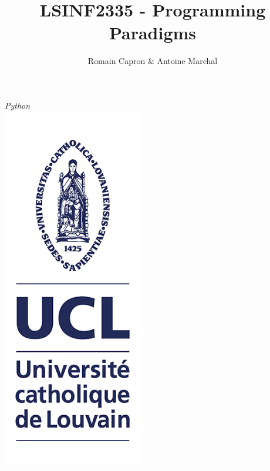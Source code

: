 

\title{LSINF2335 - Programming Paradigms}
\author{Romain Capron \& Antoine Marchal}




\maketitle
\begin{center}
  \vspace{-7mm}
  \textit{Python}\\
  \includegraphics[width=175pt]{../img/logo}\\
\end{center}
\newpage
\clearpage

\tableofcontents
\newpage






